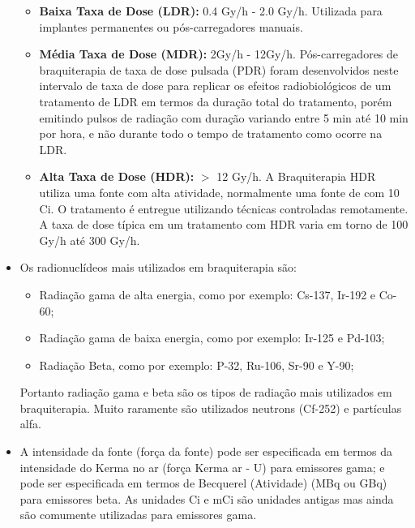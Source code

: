 \documentclass[11pt,a4paper]{article}
\newcounter{exemplo}
\begin{document}
\begin{exemplo}[8. Braquiterapia]
\begin{itemize}
            \begin{itemize}[label=\textcolor{CarnationPink}{\textopenbullet}]
                \item \textcolor{CarnationPink}{\textbf{Baixa Taxa de Dose (LDR):}} 0.4 Gy/h - 2.0 Gy/h. Utilizada para implantes permanentes ou pós-carregadores manuais. 
                \item \textcolor{CarnationPink}{\textbf{Média Taxa de Dose (MDR):}} 2Gy/h - 12Gy/h. Pós-carregadores de braquiterapia de taxa de dose pulsada (PDR) foram desenvolvidos neste intervalo de taxa de dose para replicar os efeitos radiobiológicos de um tratamento de LDR em termos da duração total do tratamento, porém emitindo pulsos de radiação com duração variando entre 5 min até 10 min por hora, e não durante todo o tempo de tratamento como ocorre na LDR.
                \item \textcolor{CarnationPink}{\textbf{Alta Taxa de Dose (HDR):}} $>$ 12 Gy/h. A Braquiterapia HDR utiliza uma fonte com alta atividade, normalmente uma fonte de  com 10 Ci. O tratamento é entregue utilizando técnicas controladas remotamente. A taxa de dose típica em um tratamento com HDR varia em torno de 100 Gy/h até 300 Gy/h.
            \end{itemize}

        \item Os radionuclídeos mais utilizados em braquiterapia são:
        
            \begin{itemize}[label=\textcolor{CarnationPink}{\textopenbullet}]
                \item Radiação gama de alta energia, como por exemplo: Cs-137, Ir-192 e Co-60;
                \item Radiação gama de baixa energia, como por exemplo: Ir-125 e Pd-103;
                \item Radiação Beta, como por exemplo: P-32, Ru-106, Sr-90 e Y-90;
            \end{itemize}

            Portanto radiação gama e beta são os tipos de radiação mais utilizados em braquiterapia. Muito raramente são utilizados neutrons (Cf-252) e partículas alfa. 


        \item A intensidade da fonte (força da fonte) pode ser especificada em termos da intensidade do Kerma no ar (força Kerma ar - U) para emissores gama; e pode ser especificada em termos de Becquerel (Atividade) (MBq ou GBq) para emissores beta. As unidades Ci e mCi são unidades antigas mas ainda são comumente utilizadas para emissores gama.
        

\end{itemize}
\end{exemplo}
\end{document}
